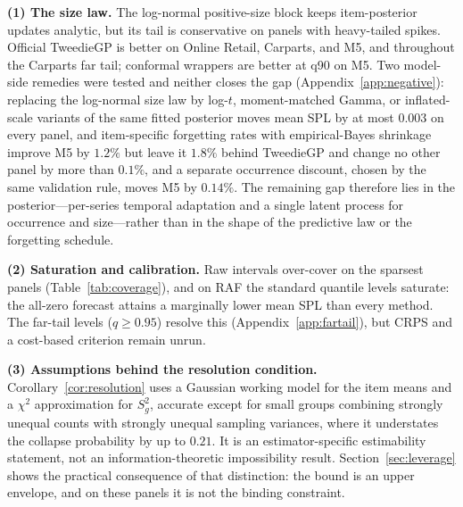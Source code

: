 \documentclass[twoside]{article}
\theoremstyle{definition}
\begin{document}
\textbf{(1) The size law.} The log-normal positive-size block keeps
item-posterior updates analytic, but its tail is conservative on panels
with heavy-tailed spikes. %
Official TweedieGP is better on Online Retail, Carparts, and M5, and
throughout the Carparts far tail; conformal wrappers are better at q90 on
M5. Two model-side remedies were tested and neither closes the gap
(Appendix~\ref{app:negative}): replacing the log-normal size law by
log-$t$, moment-matched Gamma, or inflated-scale variants of the same
fitted posterior moves mean SPL by at most $0.003$ on every panel, and
item-specific forgetting rates with empirical-Bayes shrinkage improve M5
by $1.2\%$ but leave it $1.8\%$ behind TweedieGP and change no other
panel by more than $0.1\%$, and a separate occurrence discount, chosen
by the same validation rule, moves M5 by $0.14\%$. The remaining gap
therefore lies in the posterior---per-series temporal adaptation and a
single latent process for occurrence and size---rather than in the
shape of the predictive law or the forgetting schedule.

\textbf{(2) Saturation and calibration.} Raw intervals over-cover on the
sparsest panels (Table~\ref{tab:coverage}), and on RAF the standard
quantile levels saturate: the all-zero forecast attains a marginally lower
mean SPL than every method. The far-tail levels ($q\ge0.95$) resolve this
(Appendix~\ref{app:fartail}), but CRPS and a cost-based criterion remain
unrun.

\textbf{(3) Assumptions behind the resolution condition.}
Corollary~\ref{cor:resolution} uses a Gaussian working model for the item
means and a $\chi^2$ approximation for $S_g^2$, accurate except for small
groups combining strongly unequal counts with strongly unequal sampling
variances, where it understates the collapse probability by up to $0.21$.
It is an estimator-specific estimability statement, not an
information-theoretic impossibility result. Section~\ref{sec:leverage}
shows the practical consequence of that distinction: the bound is an upper
envelope, and on these panels it is not the binding constraint.
\end{document}
